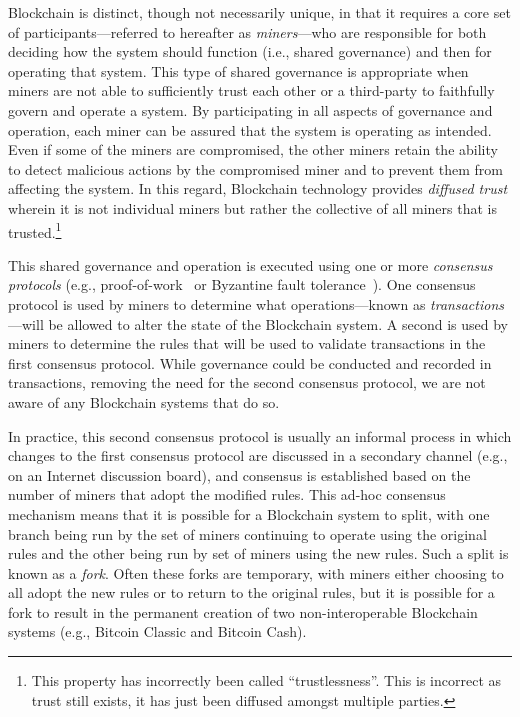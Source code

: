 Blockchain is distinct, though not necessarily unique, in that it requires a core set of participants---referred to hereafter as \emph{miners}---who are responsible for both deciding how the system should function (i.e., shared governance) and then for operating that system.
This type of shared governance is appropriate when miners are not able to sufficiently trust each other or a third-party to faithfully govern and operate a system.
By participating in all aspects of governance and operation, each miner can be assured that the system is operating as intended.
Even if some of the miners are compromised, the other miners retain the ability to detect malicious actions by the compromised miner and to prevent them from affecting the system.
In this regard, Blockchain technology provides \emph{diffused trust} wherein it is not individual miners but rather the collective of all miners that is trusted.\footnote{This property has incorrectly been called ``trustlessness''. This is incorrect as trust still exists, it has just been diffused amongst multiple parties.} 

This shared governance and operation is executed using one or more \emph{consensus protocols} (e.g., proof-of-work~\cite{DN93,back1997partial,NakamotoS8} or Byzantine fault tolerance~\cite{castro1999practical}).
One consensus protocol is used by miners to determine what operations---known as \emph{transactions}---will be allowed to alter the state of the Blockchain system.
A second is used by miners to determine the rules that will be used to validate transactions in the first consensus protocol.
While governance could be conducted and recorded in transactions, removing the need for the second consensus protocol, we are not aware of any Blockchain systems that do so.

In practice, this second consensus protocol is usually an informal process in which changes to the first consensus protocol are discussed in a secondary channel (e.g., on an Internet discussion board), and consensus is established based on the number of miners that adopt the modified rules.
This ad-hoc consensus mechanism means that it is possible for a Blockchain system to split, with one branch being run by the set of miners continuing to operate using the original rules and the other being run by set of miners using the new rules.
Such a split is known as a \emph{fork}.
Often these forks are temporary, with miners either choosing to all adopt the new rules or to return to the original rules, but it is possible for a fork to result in the permanent creation of two non-interoperable Blockchain systems (e.g., Bitcoin Classic and Bitcoin Cash).

